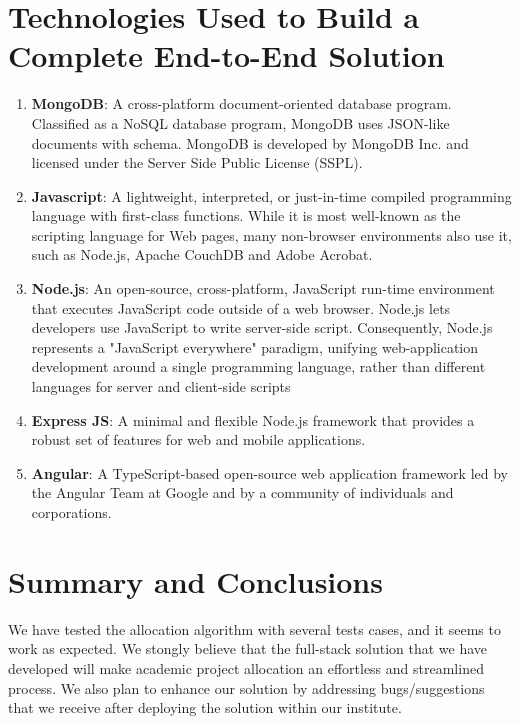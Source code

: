 \documentclass{article}
\begin{document}
\section{Technologies Used to Build a Complete End-to-End Solution}

\begin{enumerate}
	\item \textbf{MongoDB}: A cross-platform document-oriented database program. Classified as a NoSQL database program, MongoDB uses JSON-like documents with schema. MongoDB is developed by MongoDB Inc. and licensed under the Server Side Public License (SSPL).
	
	\item \textbf{Javascript}: A lightweight, interpreted, or just-in-time compiled programming language with first-class functions. While it is most well-known as the scripting language for Web pages, many non-browser environments also use it, such as Node.js, Apache CouchDB and Adobe Acrobat.
	
	\item \textbf{Node.js}: An open-source, cross-platform, JavaScript run-time environment that executes JavaScript code outside of a web browser. Node.js lets developers use JavaScript to write server-side script. Consequently, Node.js represents a "JavaScript everywhere" paradigm, unifying web-application development around a single programming language, rather than different languages for server and client-side scripts
	
	\item \textbf{Express JS}: A minimal and flexible Node.js framework that provides a robust set of features for web and mobile applications.
	
	\item \textbf{Angular}: A TypeScript-based open-source web application framework led by the Angular Team at Google and by a community of individuals and corporations.
\end{enumerate}



\section{Summary and Conclusions}
We have tested the allocation algorithm with several tests cases, and it seems to work as expected. We stongly believe that the full-stack solution that we have developed will make academic project allocation an effortless and streamlined process. We also plan to enhance our solution by addressing bugs/suggestions that we receive after deploying the solution within our institute. 
\end{document}
